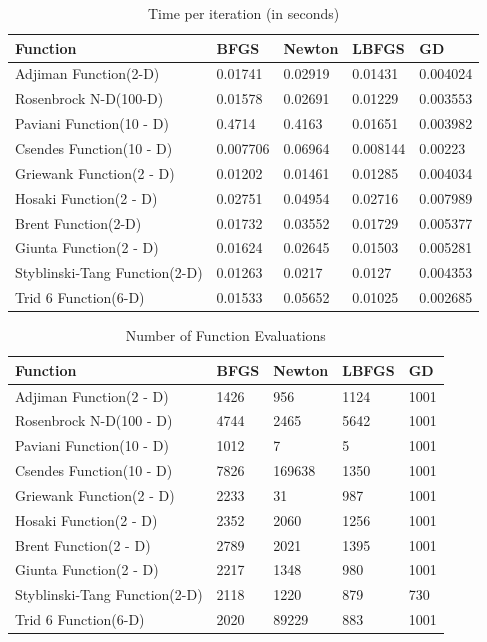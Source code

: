 \documentclass[12pt]{report}
\begin{document}
\begin{table}[htpb]
	\centering
	\caption{Time per iteration (in seconds)}
	\label{tab:label}
	\begin{tabular}{lllll}
		\toprule
		Function                      & BFGS     & Newton  & LBFGS    & GD       \\
		\midrule
		Adjiman Function(2-D)         & 0.01741  & 0.02919 & 0.01431  & 0.004024 \\
		Rosenbrock N-D(100-D)         & 0.01578  & 0.02691 & 0.01229  & 0.003553 \\
		Paviani Function(10 - D)      & 0.4714   & 0.4163  & 0.01651  & 0.003982 \\
		Csendes Function(10 - D)      & 0.007706 & 0.06964 & 0.008144 & 0.00223  \\
		Griewank Function(2 - D)      & 0.01202  & 0.01461 & 0.01285  & 0.004034 \\
		Hosaki Function(2 - D)        & 0.02751  & 0.04954 & 0.02716  & 0.007989 \\
		Brent Function(2-D)           & 0.01732  & 0.03552 & 0.01729  & 0.005377 \\
		Giunta Function(2 - D)        & 0.01624  & 0.02645 & 0.01503  & 0.005281 \\
		Styblinski-Tang Function(2-D) & 0.01263  & 0.0217  & 0.0127   & 0.004353 \\
		Trid 6 Function(6-D)          & 0.01533  & 0.05652 & 0.01025  & 0.002685 \\
		\bottomrule
	\end{tabular}
\end{table}
\begin{table}[htpb]
	\centering
	\caption{Number of Function Evaluations}
	\label{tab:label}
	\begin{tabular}{lllll}
		\toprule
		Function                      & BFGS & Newton & LBFGS & GD   \\
		\midrule
		Adjiman Function(2 - D)       & 1426 & 956    & 1124  & 1001 \\
		Rosenbrock N-D(100 - D)       & 4744 & 2465   & 5642  & 1001 \\
		Paviani Function(10 - D)      & 1012 & 7      & 5     & 1001 \\
		Csendes Function(10 - D)      & 7826 & 169638 & 1350  & 1001 \\
		Griewank Function(2 - D)      & 2233 & 31     & 987   & 1001 \\
		Hosaki Function(2 - D)        & 2352 & 2060   & 1256  & 1001 \\
		Brent Function(2 - D)         & 2789 & 2021   & 1395  & 1001 \\
		Giunta Function(2 - D)        & 2217 & 1348   & 980   & 1001 \\
		Styblinski-Tang Function(2-D) & 2118 & 1220   & 879   & 730  \\
		Trid 6 Function(6-D)          & 2020 & 89229  & 883   & 1001 \\
		\bottomrule
	\end{tabular}
\end{table}
\end{document}
